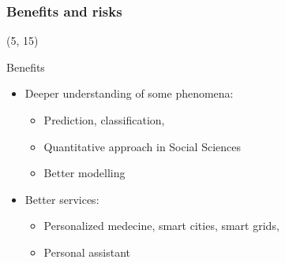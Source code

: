 \begin{frame}
  \frametitle{Benefits and risks}

  \begin{textblock}{45}(5, 15)
    \begin{block}{Benefits}
      \begin{itemize}
      \item Deeper understanding of some phenomena:
        \begin{itemize}
        \item Prediction, classification, \etc{}
        \item Quantitative approach in Social Sciences
        \item Better modelling
        \end{itemize}
      \item Better services:
        \begin{itemize}
        \item Personalized medecine, smart cities, smart grids, \etc{}
        \item Personal assistant
        \end{itemize}
      \end{itemize}
    \end{block}
  \end{textblock}


\end{frame}
